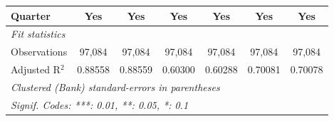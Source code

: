 \begin{tabular}{lcccccc}
   Quarter                      & Yes            & Yes            & Yes                   & Yes             & Yes            & Yes\\  
   \midrule
   \emph{Fit statistics}\\
   Observations                 & 97,084         & 97,084         & 97,084                & 97,084          & 97,084         & 97,084\\  
   Adjusted R$^2$               & 0.88558        & 0.88559        & 0.60300               & 0.60288         & 0.70081        & 0.70078\\  
   \midrule \midrule
   \multicolumn{7}{l}{\emph{Clustered (Bank) standard-errors in parentheses}}\\
   \multicolumn{7}{l}{\emph{Signif. Codes: ***: 0.01, **: 0.05, *: 0.1}}\\
\end{tabular}
\par\endgroup



